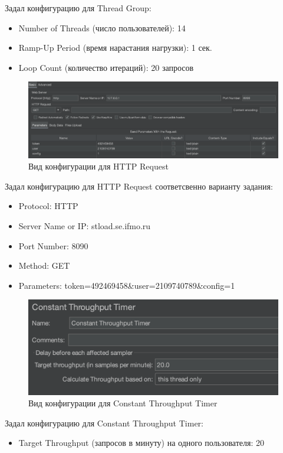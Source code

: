 \documentclass[12pt,onecolumn]{article}
\begin{document}
Задал конфигурацию для Thread Group:
\begin{itemize}
  \item[] Number of Threads (число пользователей): 14
  \item[] Ramp-Up Period (время нарастания нагрузки): 1 сек.
  \item[] Loop Count (количество итераций): 20 запросов
\end{itemize}

\begin{figure}[H]
  \includegraphics[width=\textwidth]{image/http-request.png}
  \caption{Вид конфигурации для HTTP Request}
\end{figure}

Задал конфигурацию для HTTP Request соответсвенно варианту задания:
\begin{itemize}
  \item[] Protocol: HTTP
  \item[] Server Name or IP: stload.se.ifmo.ru
  \item[] Port Number: 8090
  \item[] Method: GET
  \item[] Parameters: token=492469458\&user=2109740789\&config=1
\end{itemize}

\begin{figure}[H]
  \includegraphics[width=\textwidth]{image/constant-throughput-timer.png}
  \caption{Вид конфигурации для Constant Throughput Timer}
\end{figure}

Задал конфигурацию для Constant Throughput Timer:
\begin{itemize}
  \item[] Target Throughput (запросов в минуту) на одного пользователя: 20
\end{itemize}
\end{document}
